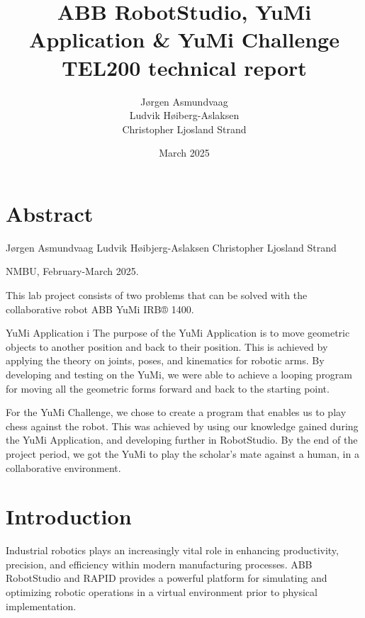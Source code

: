\documentclass[a4paper,12pt]{article}
\begin{document}
\begin{titlepage}
    \centering
    \vfill
    
    \title{ABB RobotStudio, YuMi Application \& YuMi Challenge \\ \large TEL200 technical report}
    \author{J\o rgen Asmundvaag \\ Ludvik H\o iberg-Aslaksen \\ Christopher Ljosland Strand}
    \date{March 2025}
    \maketitle
    
    \vfill
\end{titlepage}


\newpage
\tableofcontents

\newpage
\section{Abstract}
Jørgen Asmundvaag
Ludvik Høibjerg-Aslaksen
Christopher Ljosland Strand

NMBU, February-March 2025.

This lab project consists of two problems that can be solved with the collaborative robot ABB YuMi IRB® 1400. 

YuMi Application i
The purpose of the YuMi Application is to move geometric objects to another position and back to their position. This is achieved by applying the theory on joints, poses, and kinematics for robotic arms. By developing and testing on the YuMi, we were able to achieve a looping program for moving all the geometric forms forward and back to the starting point. 

For the YuMi Challenge, we chose to create a program that enables us to play chess against the robot. This was achieved by using our knowledge gained during the YuMi Application, and developing further in RobotStudio. By the end of the project period, we got the YuMi to play the scholar's mate against a human, in a collaborative environment. 

\section{Introduction}
Industrial robotics plays an increasingly vital role in enhancing productivity, precision, and efficiency within modern manufacturing processes. ABB RobotStudio and RAPID provides a powerful platform for simulating and optimizing robotic operations in a virtual environment prior to physical implementation.
\end{document}
